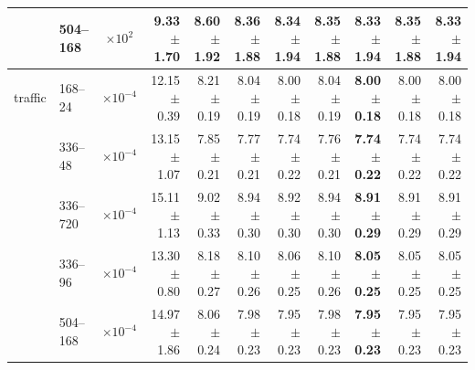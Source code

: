 \begin{table}[htbp]
\begin{tabular}{llcrrrrrrr|r}
 & 504--168 & $\times 10^{2}$ & 9.33 $\pm$ 1.70 & 8.60 $\pm$ 1.92 & 8.36 $\pm$ 1.88 & 8.34 $\pm$ 1.94 & 8.35 $\pm$ 1.88 & \textbf{8.33 $\pm$ 1.94} & 8.35 $\pm$ 1.88 & 8.33 $\pm$ 1.94 \\
\midrule
traffic & 168--24 & $\times 10^{-4}$ & 12.15 $\pm$ 0.39 & 8.21 $\pm$ 0.19 & 8.04 $\pm$ 0.19 & 8.00 $\pm$ 0.18 & 8.04 $\pm$ 0.19 & \textbf{8.00 $\pm$ 0.18} & 8.00 $\pm$ 0.18 & 8.00 $\pm$ 0.18 \\
 & 336--48 & $\times 10^{-4}$ & 13.15 $\pm$ 1.07 & 7.85 $\pm$ 0.21 & 7.77 $\pm$ 0.21 & 7.74 $\pm$ 0.22 & 7.76 $\pm$ 0.21 & \textbf{7.74 $\pm$ 0.22} & 7.74 $\pm$ 0.22 & 7.74 $\pm$ 0.22 \\
 & 336--720 & $\times 10^{-4}$ & 15.11 $\pm$ 1.13 & 9.02 $\pm$ 0.33 & 8.94 $\pm$ 0.30 & 8.92 $\pm$ 0.30 & 8.94 $\pm$ 0.30 & \textbf{8.91 $\pm$ 0.29} & 8.91 $\pm$ 0.29 & 8.91 $\pm$ 0.29 \\
 & 336--96 & $\times 10^{-4}$ & 13.30 $\pm$ 0.80 & 8.18 $\pm$ 0.27 & 8.10 $\pm$ 0.26 & 8.06 $\pm$ 0.25 & 8.10 $\pm$ 0.26 & \textbf{8.05 $\pm$ 0.25} & 8.05 $\pm$ 0.25 & 8.05 $\pm$ 0.25 \\
 & 504--168 & $\times 10^{-4}$ & 14.97 $\pm$ 1.86 & 8.06 $\pm$ 0.24 & 7.98 $\pm$ 0.23 & 7.95 $\pm$ 0.23 & 7.98 $\pm$ 0.23 & \textbf{7.95 $\pm$ 0.23} & 7.95 $\pm$ 0.23 & 7.95 $\pm$ 0.23 \\
\bottomrule
\end{tabular}
\end{table}
